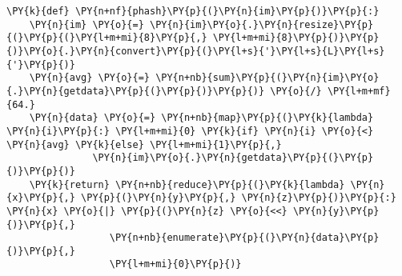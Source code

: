 \begin{Verbatim}[commandchars=\\\{\}]
\PY{k}{def} \PY{n+nf}{phash}\PY{p}{(}\PY{n}{im}\PY{p}{)}\PY{p}{:}
    \PY{n}{im} \PY{o}{=} \PY{n}{im}\PY{o}{.}\PY{n}{resize}\PY{p}{(}\PY{p}{(}\PY{l+m+mi}{8}\PY{p}{,} \PY{l+m+mi}{8}\PY{p}{)}\PY{p}{)}\PY{o}{.}\PY{n}{convert}\PY{p}{(}\PY{l+s}{'}\PY{l+s}{L}\PY{l+s}{'}\PY{p}{)}
    \PY{n}{avg} \PY{o}{=} \PY{n+nb}{sum}\PY{p}{(}\PY{n}{im}\PY{o}{.}\PY{n}{getdata}\PY{p}{(}\PY{p}{)}\PY{p}{)} \PY{o}{/} \PY{l+m+mf}{64.}
    \PY{n}{data} \PY{o}{=} \PY{n+nb}{map}\PY{p}{(}\PY{k}{lambda} \PY{n}{i}\PY{p}{:} \PY{l+m+mi}{0} \PY{k}{if} \PY{n}{i} \PY{o}{<} \PY{n}{avg} \PY{k}{else} \PY{l+m+mi}{1}\PY{p}{,}
               \PY{n}{im}\PY{o}{.}\PY{n}{getdata}\PY{p}{(}\PY{p}{)}\PY{p}{)}
    \PY{k}{return} \PY{n+nb}{reduce}\PY{p}{(}\PY{k}{lambda} \PY{n}{x}\PY{p}{,} \PY{p}{(}\PY{n}{y}\PY{p}{,} \PY{n}{z}\PY{p}{)}\PY{p}{:} \PY{n}{x} \PY{o}{|} \PY{p}{(}\PY{n}{z} \PY{o}{<<} \PY{n}{y}\PY{p}{)}\PY{p}{,}
                  \PY{n+nb}{enumerate}\PY{p}{(}\PY{n}{data}\PY{p}{)}\PY{p}{,}
                  \PY{l+m+mi}{0}\PY{p}{)}
\end{Verbatim}
